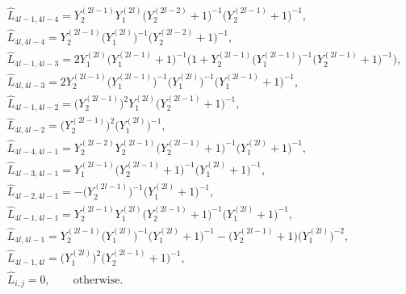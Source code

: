 \documentclass[10pt,a4paper]{amsart}
\numberwithin{equation}{section}
\begin{document}
	\begin{align*}
		&\hat{L}_{4l-1,4l-4}=Y_2^{(2l-1)}Y_1^{(2l)}\bigl(Y_2^{(2l-2)}+1\bigr)^{-1}\bigl(Y_2^{(2l-1)}+1\bigr)^{-1},\\
		&\hat{L}_{4l,4l-4}=Y_2^{(2l-1)}\bigl(Y_1^{(2l)}\bigr)^{-1}\bigl(Y_2^{(2l-2)}+1\bigr)^{-1},\\
		&\hat{L}_{4l-1,4l-3}=2Y_1^{(2l)}\bigl(Y_1^{(2l-1)}+1\bigr)^{-1}\bigl(1+Y_2^{(2l-1)}(Y_1^{(2l-1)}\bigr)^{-1}\bigl(Y_2^{(2l-1)}+1\bigr)^{-1}\bigr),\\
		&\hat{L}_{4l,4l-3}=2Y_2^{(2l-1)}\bigl(Y_1^{(2l-1)}\bigr)^{-1}\bigl(Y_1^{(2l)}\bigr)^{-1}\bigl(Y_1^{(2l-1)}+1\bigr)^{-1},\\
		&\hat{L}_{4l-1,4l-2}=\bigl(Y_2^{(2l-1)}\bigr)^2Y_1^{(2l)}\bigl(Y_2^{(2l-1)}+1\bigr)^{-1},\\
		&\hat{L}_{4l,4l-2}=\bigl(Y_2^{(2l-1)}\bigr)^2\bigl(Y_1^{(2l)}\bigr)^{-1},\\
		&\hat{L}_{4l-4,4l-1}=Y_2^{(2l-2)}Y_2^{(2l-1)}\bigl(Y_2^{(2l-1)}+1\bigr)^{-1}\bigl(Y_1^{(2l)}+1\bigr)^{-1},\\
		&\hat{L}_{4l-3,4l-1}=Y_1^{(2l-1)}\bigl(Y_2^{(2l-1)}+1\bigr)^{-1}\bigl(Y_1^{(2l)}+1\bigr)^{-1},\\
		&\hat{L}_{4l-2,4l-1}=-\bigl(Y_2^{(2l-1)}\bigr)^{-1}\bigl(Y_1^{(2l)}+1\bigr)^{-1},\\
		&\hat{L}_{4l-1,4l-1}=Y_2^{(2l-1)}Y_1^{(2l)}\bigl(Y_2^{(2l-1)}+1\bigr)^{-1}\bigl(Y_1^{(2l)}+1\bigr)^{-1},\\
		&\hat{L}_{4l,4l-1}=Y_2^{(2l-1)}\bigl(Y_1^{(2l)}\bigr)^{-1}\bigl(Y_1^{(2l)}+1\bigr)^{-1}-\bigl(Y_2^{(2l-1)}+1\bigr)\bigl(Y_1^{(2l)}\bigr)^{-2},\\
		&\hat{L}_{4l-1,4l}=\bigl(Y_1^{(2l)}\bigr)^2\bigl(Y_2^{(2l-1)}+1\bigr)^{-1},\\
		&\hat{L}_{i,j}=0,\qquad \text{otherwise}.
	\end{align*}
	
\end{document}
